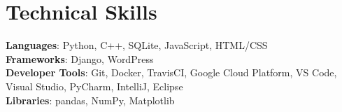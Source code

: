\documentclass[letterpaper,11pt]{article}
\begin{document}
%
\section{Technical Skills}
 \begin{itemize}[leftmargin=0.15in, label={}]
    \small{\item{
     \textbf{Languages}{: Python, C++, SQLite, JavaScript, HTML/CSS} \\
     \textbf{Frameworks}{: Django, WordPress} \\
     \textbf{Developer Tools}{: Git, Docker, TravisCI, Google Cloud Platform, VS Code, Visual Studio, PyCharm, IntelliJ, Eclipse} \\
     \textbf{Libraries}{: pandas, NumPy, Matplotlib}
    }}
 \end{itemize}


\end{document}
